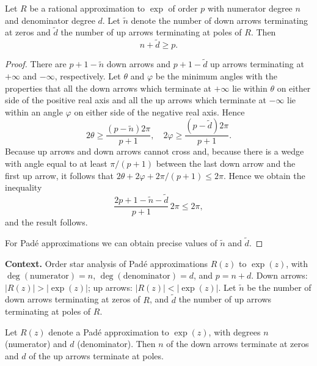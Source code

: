 \begin{theorem}

  \label{thm:355D}
Let \( R \) be a rational approximation to \( \exp \) of order \( p \) with numerator degree \( n \) and denominator degree \( d \). Let \( \tilde{n} \) denote the number of down arrows terminating at zeros and \( \tilde{d} \) the number of up arrows terminating at poles of \( R \). Then
\[
n + \tilde{d} \geq p.
\]
\end{theorem}

\begin{proof}
There are \( p + 1 - \tilde{n} \) down arrows and \( p + 1 - \tilde{d} \) up arrows terminating at \( +\infty \) and \( -\infty \), respectively. Let \( \theta \) and \( \varphi \) be the minimum angles with the properties that all the down arrows which terminate at \( +\infty \) lie within \( \theta \) on either side of the positive real axis and all the up arrows which terminate at \( -\infty \) lie within an angle \( \varphi \) on either side of the negative real axis. Hence
\[
2\theta \geq \frac{(p - \tilde{n})2\pi}{p+1}, \quad 2\varphi \geq \frac{(p - \tilde{d})2\pi}{p+1}.
\]
Because up arrows and down arrows cannot cross and, because there is a wedge with angle equal to at least \( \pi/(p + 1) \) between the last down arrow and the first up arrow, it follows that \( 2\theta + 2\varphi + 2\pi/(p + 1) \leq 2\pi \). Hence we obtain the inequality
\[
\frac{2p + 1 - \tilde{n} - \tilde{d}}{p+1} \, 2\pi \leq 2\pi,
\]
and the result follows.

For Pad\'e approximations we can obtain precise values of \( \tilde{n} \) and \( \tilde{d} \).
\end{proof}

\noindent\textbf{Context.}
Order star analysis of Pad\'e approximations $R(z)$ to $\exp(z)$, with $\deg(\text{numerator})=n$, $\deg(\text{denominator})=d$, and $p=n+d$. Down arrows: $|R(z)|>|\exp(z)|$; up arrows: $|R(z)|<|\exp(z)|$. Let $\tilde{n}$ be the number of down arrows terminating at zeros of $R$, and $\tilde{d}$ the number of up arrows terminating at poles of $R$.

\begin{theorem}

  \label{thm:355E}
Let \( R(z) \) denote a Pad\'{e} approximation to \( \exp(z) \), with degrees \( n \) (numerator) and \( d \) (denominator). Then \( n \) of the down arrows terminate at zeros and \( d \) of the up arrows terminate at poles.
\end{theorem}

